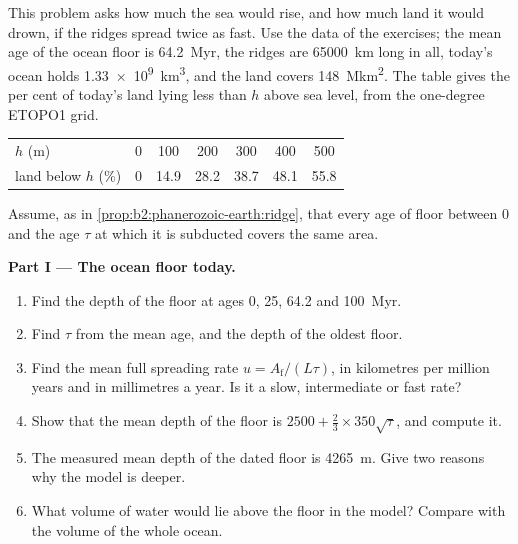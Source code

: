 \begin{problem}\label{pb:b2:phanerozoic-earth:1}
This problem asks how much the sea would rise, and how much land it would drown, if the
ridges spread twice as fast. Use the data of the exercises; the mean age of the ocean floor is
\qty{64.2}{Myr}, the ridges are \qty{65000}{km} long in all, today's ocean holds
\qty{1.33e9}{km^3}, and the land covers \qty{148}{\mega km^2}. The table gives the per cent of
today's land lying less than $h$ above sea level, from the one-degree ETOPO1 grid.
\begin{center}
\small
\begin{tabular}{lcccccc}
\hline
$h$ (\unit{m}) & 0 & 100 & 200 & 300 & 400 & 500 \\
land below $h$ (\unit{\percent}) & 0 & 14.9 & 28.2 & 38.7 & 48.1 & 55.8 \\
\hline
\end{tabular}
\end{center}
Assume, as in \cref{prop:b2:phanerozoic-earth:ridge}, that every age of floor between 0 and the
age $\tau$ at which it is subducted covers the same area.

\noindent\textbf{Part I --- The ocean floor today.}
\begin{enumerate}
  \item Find the depth of the floor at ages 0, 25, 64.2 and \qty{100}{Myr}.
  \item Find $\tau$ from the mean age, and the depth of the oldest floor.
  \item Find the mean full spreading rate $u = A_{\text{f}}/(L\tau)$, in kilometres per million
        years and in millimetres a year. Is it a slow, intermediate or fast rate?
  \item Show that the mean depth of the floor is $2500 + \tfrac23 \times 350\sqrt\tau$, and
        compute it.
  \item The measured mean depth of the dated floor is \qty{4265}{m}. Give two reasons why the
        model is deeper.
  \item What volume of water would lie above the floor in the model? Compare with the volume of
        the whole ocean.
\end{enumerate}


\end{problem}
